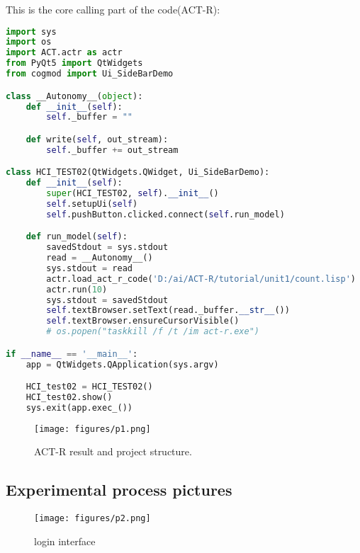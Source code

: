 \documentclass[twoside,11pt]{article}
\begin{document}


This is the core calling part of the code(ACT-R):


\begin{lstlisting}[language=python]
import sys
import os
import ACT.actr as actr
from PyQt5 import QtWidgets
from cogmod import Ui_SideBarDemo

class __Autonomy__(object):
    def __init__(self):
        self._buffer = ""

    def write(self, out_stream):
        self._buffer += out_stream

class HCI_TEST02(QtWidgets.QWidget, Ui_SideBarDemo):
    def __init__(self):
        super(HCI_TEST02, self).__init__()
        self.setupUi(self)
        self.pushButton.clicked.connect(self.run_model)

    def run_model(self):
        savedStdout = sys.stdout
        read = __Autonomy__()
        sys.stdout = read
        actr.load_act_r_code('D:/ai/ACT-R/tutorial/unit1/count.lisp')
        actr.run(10)
        sys.stdout = savedStdout
        self.textBrowser.setText(read._buffer.__str__())
        self.textBrowser.ensureCursorVisible()
        # os.popen("taskkill /f /t /im act-r.exe")

if __name__ == '__main__':
    app = QtWidgets.QApplication(sys.argv)

    HCI_test02 = HCI_TEST02()
    HCI_test02.show()
    sys.exit(app.exec_())
\end{lstlisting}

\begin{figure}[H]
    \begin{center}
    	\texttt{[image: figures/p1.png]}
		\caption{ACT-R result and project structure.}
		\label{fig:deri}
    \end{center}
\end{figure}


\subsection{Experimental process pictures}

\begin{figure}[H]
    \begin{center}
    	\texttt{[image: figures/p2.png]}
		\caption{login interface}
		\label{fig:deri}
    \end{center}
\end{figure}
\end{document}
